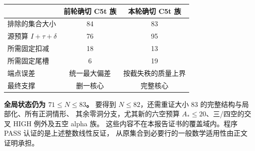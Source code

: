 \documentclass[11pt,a4paper]{article}
\newcommand{\A}{A_*}
\begin{document}
\begin{center}
\begin{tabular}{lcc}
\toprule & 前轮确切 C5t 族 & 本轮确切 C5t 族\\\midrule
排除的集合大小 &84&83\\
源预算 $I+\tau+\delta$ &76&95\\
所需固定扣减 &18&13\\
所需固定尾槽 &6&19\\
端点误差 &统一最大偏差&按截失秩的质量上界\\
最终支撑 &删一核心&完整核心\\\bottomrule
\end{tabular}
\end{center}

\textbf{全局状态仍为 $71\le N\le83$。}
要得到 $N\le82$，还需重证大小 83 的完整结构与局部化、所有正洞情形、
其余零洞分支，尤其新的六空预算 $\A\le20$、三/四空的交叉 HIGH 例外及五空 alpha 族。
这些内容不在本报告证书的覆盖域内。程序 PASS 认证的是上述整数线性反证，
从原集合到必要行的一般数学适用性由正文证明承担。
\end{document}
